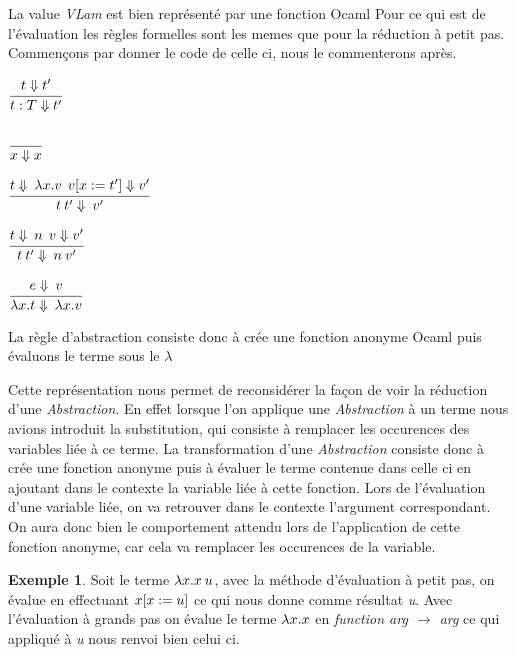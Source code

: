 \documentclass {article}
\newcommand{\codefrom}[3]
           {}
\theoremstyle{definition}
\newtheorem{example}{Exemple}
\theoremstyle{remark}
\begin{document}
\codefrom{typed}{lambda}{value}
\codefrom{typed}{lambda}{neutral}

La value \emph{VLam} est bien représenté par une fonction Ocaml
Pour ce qui est de l'évaluation les règles formelles sont les memes que pour 
la réduction à petit pas. 
Commençons par donner le code de celle ci, nous le commenterons après.


\codefrom{typed}{lambda}{big_step_eval_exTm_ann}
$\cfrac{t \Downarrow t'}
  {t:T \Downarrow t'}$

\codefrom{typed}{lambda}{big_step_eval_exTm_var}

$\cfrac{}
{x \Downarrow x}$

\codefrom{typed}{lambda}{big_step_eval_exTm_app}
\codefrom{typed}{lambda}{vapp}
$\cfrac{t \Downarrow \: \lambda x.v \:\: v[x := t']\Downarrow v'}
{t\:t'\Downarrow \: v'}$

$\cfrac{t \Downarrow \: n \:\: v \Downarrow v'}
{t\:t'\Downarrow \: n \: v'}$
  

\codefrom{typed}{lambda}{big_step_eval_inTm_inv}

\codefrom{typed}{lambda}{big_step_eval_inTm_abs}

$\cfrac{e \Downarrow \: v}
  {\lambda x.t \Downarrow \: \lambda x.v}$


La règle d'abstraction consiste donc à crée une fonction anonyme Ocaml puis évaluons 
le terme sous le $\lambda$

Cette représentation nous permet de reconsidérer la façon de voir la 
réduction d'une \emph{Abstraction}. En effet lorsque l'on applique une \emph{Abstraction}
à un terme nous avions introduit la substitution, qui consiste à remplacer les occurences 
des variables liée à ce terme. La transformation d'une \emph{Abstraction} consiste donc à 
crée une fonction anonyme puis à évaluer le terme contenue dans celle ci en ajoutant dans le 
contexte la variable liée à cette fonction. Lors de l'évaluation d'une variable liée, on va
retrouver dans le contexte l'argument correspondant. On aura donc bien le comportement attendu
lors de l'application de cette fonction anonyme, car cela va remplacer les occurences de la 
variable.

\begin{example}
  Soit le terme \(\lambda x. x\:u\), avec la méthode d'évaluation à petit pas,
  on évalue en effectuant $x[x := u]$ ce qui nous donne comme résultat
  \emph{u}. 
  Avec l'évaluation à grands pas on évalue le terme $\lambda x. x$ en 
  \emph{function arg $\rightarrow$ arg} ce qui appliqué à \emph{u} nous renvoi bien celui ci.
\end{example}
\end{document}
